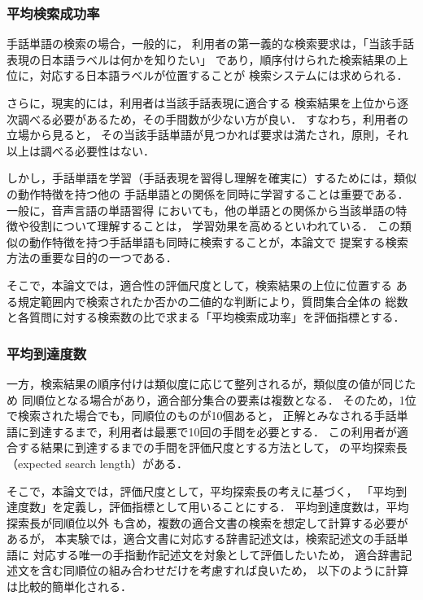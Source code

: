\subsubsection {平均検索成功率}

手話単語の検索の場合，一般的に，
利用者の第一義的な検索要求は，「当該手話表現の日本語ラベルは何かを知りたい」
であり，順序付けられた検索結果の上位に，対応する日本語ラベルが位置することが
検索システムには求められる．

さらに，現実的には，利用者は当該手話表現に適合する
検索結果を上位から逐次調べる必要があるため，その手間数が少ない方が良い．
すなわち，利用者の立場から見ると，
その当該手話単語が見つかれば要求は満たされ，原則，それ以上は調べる必要性はない．

しかし，手話単語を学習（手話表現を習得し理解を確実に）するためには，類似の動作特徴を持つ他の
手話単語との関係を同時に学習することは重要である．一般に，音声言語の単語習得
においても，他の単語との関係から当該単語の特徴や役割について理解することは，
学習効果を高めるといわれている．
この類似の動作特徴を持つ手話単語も同時に検索することが，本論文で
提案する検索方法の重要な目的の一つである．

そこで，本論文では，適合性の評価尺度として，検索結果の上位に位置する
ある規定範囲内で検索されたか否かの二値的な判断により，質問集合全体の
総数と各質問に対する検索数の比で求まる「平均検索成功率」を評価指標とする．

\subsubsection {平均到達度数}

一方，検索結果の順序付けは類似度に応じて整列されるが，類似度の値が同じため
同順位となる場合があり，適合部分集合の要素は複数となる．
そのため，1位で検索された場合でも，同順位のものが10個あると，
正解とみなされる手話単語に到達するまで，利用者は最悪で10回の手間を必要とする．
この利用者が適合する結果に到達するまでの手間を評価尺度とする方法として，
\cite{Cooper1968}の平均探索長（expected search length）がある．

そこで，本論文では，評価尺度として，平均探索長の考えに基づく，
「平均到達度数」を定義し，評価指標として用いることにする．
平均到達度数は，平均探索長が同順位以外
も含め，複数の適合文書の検索を想定して計算する必要があるが，
本実験では，適合文書に対応する辞書記述文は，検索記述文の手話単語に
対応する唯一の手指動作記述文を対象として評価したいため，
適合辞書記述文を含む同順位の組み合わせだけを考慮すれば良いため，
以下のように計算は比較的簡単化される．

